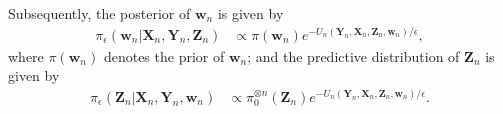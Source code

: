 \documentclass[11pt]{article}
\newcommand{\bX}{{\boldsymbol X}}
\newcommand{\bY}{{\boldsymbol Y}}
\newcommand{\bz}{{\boldsymbol z}}
\newcommand{\bZ}{{\boldsymbol Z}}
\newcommand{\bw}{{\boldsymbol w}}
\begin{document}
Subsequently, the posterior of $\bw_n$ is given by 
\begin{equation} \label{eqA12}
\begin{split}
\pi_{\epsilon}(\bw_n|\bX_n,\bY_n,\bZ_n) &  
\propto \pi(\bw_n) e^{-U_n(\bY_n,\bX_n,\bZ_n,\bw_n)/\epsilon }, 
 \end{split} 
\end{equation} 
where $\pi(\bw_n)$ denotes the prior  of $\bw_n$;
and the predictive distribution of $\bZ_n$ is given by  
\begin{equation} \label{eqA13}
\begin{split}
 \pi_{\epsilon}(\bZ_n|\bX_n,\bY_n,\bw_n) &  
 \propto \pi_0^{\otimes n}(\bZ_n) e^{-U_n(\bY_n,\bX_n,\bZ_n,\bw_n)/\epsilon}.
 \end{split} 
\end{equation} 

 
\end{document}
